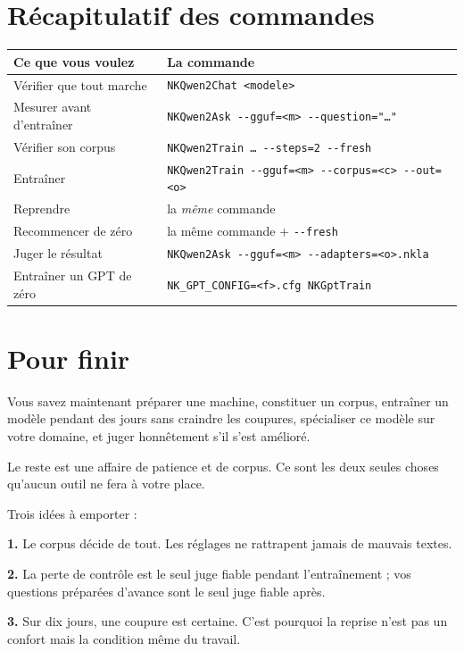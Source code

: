 \section{Récapitulatif des commandes}

\begin{center}
\begin{longtable}{p{6.0cm}p{8.0cm}}
\toprule
\textbf{Ce que vous voulez} & \textbf{La commande} \\
\midrule
\endhead
Vérifier que tout marche &
  \texttt{NKQwen2Chat <modele>} \\
Mesurer avant d'entraîner &
  \texttt{NKQwen2Ask -{}-gguf=<m> -{}-question="…"} \\
Vérifier son corpus &
  \texttt{NKQwen2Train … -{}-steps=2 -{}-fresh} \\
Entraîner &
  \texttt{NKQwen2Train -{}-gguf=<m> -{}-corpus=<c> -{}-out=<o>} \\
Reprendre &
  la \emph{même} commande \\
Recommencer de zéro &
  la même commande $+$ \texttt{-{}-fresh} \\
Juger le résultat &
  \texttt{NKQwen2Ask -{}-gguf=<m> -{}-adapters=<o>.nkla} \\
Entraîner un GPT de zéro &
  \texttt{NK\_GPT\_CONFIG=<f>.cfg NKGptTrain} \\
\bottomrule
\end{longtable}
\end{center}

\section{Pour finir}

Vous savez maintenant préparer une machine, constituer un corpus, entraîner un
modèle pendant des jours sans craindre les coupures, spécialiser ce modèle sur
votre domaine, et juger honnêtement s'il s'est amélioré.

Le reste est une affaire de patience et de corpus. Ce sont les deux seules
choses qu'aucun outil ne fera à votre place.

\begin{nkretenir}
Trois idées à emporter :

\textbf{1.} Le corpus décide de tout. Les réglages ne rattrapent jamais de
mauvais textes.

\textbf{2.} La perte de contrôle est le seul juge fiable pendant
l'entraînement ; vos questions préparées d'avance sont le seul juge fiable
après.

\textbf{3.} Sur dix jours, une coupure est certaine. C'est pourquoi la reprise
n'est pas un confort mais la condition même du travail.
\end{nkretenir}

